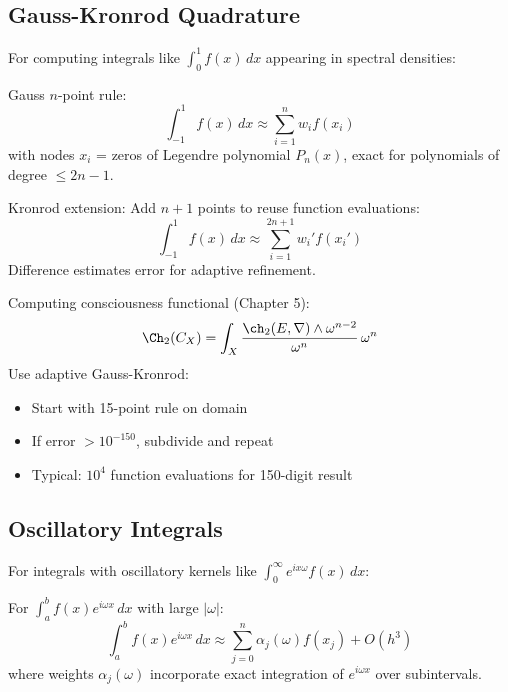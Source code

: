 \subsection{Gauss-Kronrod Quadrature}

For computing integrals like $\int_0^1 f(x)\,dx$ appearing in spectral densities:

\begin{defn}\label{def:gauss-kronrod}
Gauss $n$-point rule:
\begin{equation}
\int_{-1}^1 f(x)\,dx \approx \sum_{i=1}^n w_i f(x_i)
\end{equation}
with nodes $x_i$ = zeros of Legendre polynomial $P_n(x)$, exact for polynomials of degree $\leq 2n-1$.

Kronrod extension: Add $n+1$ points to reuse function evaluations:
\begin{equation}
\int_{-1}^1 f(x)\,dx \approx \sum_{i=1}^{2n+1} w_i' f(x_i')
\end{equation}
Difference estimates error for adaptive refinement.
\end{defn}

\begin{example}
Computing consciousness functional (Chapter 5):
\begin{equation}
\Ch_2(C_X) = \int_X \frac{\ch_2(E,\nabla) \wedge \omega^{n-2}}{\omega^n}\,\omega^n
\end{equation}
Use adaptive Gauss-Kronrod:
\begin{itemize}
\item Start with 15-point rule on domain
\item If error $> 10^{-150}$, subdivide and repeat
\item Typical: $10^4$ function evaluations for 150-digit result
\end{itemize}
\end{example}

\subsection{Oscillatory Integrals}

For integrals with oscillatory kernels like $\int_0^\infty e^{ix\omega} f(x)\,dx$:

\begin{thm}\label{thm:filon}
For $\int_a^b f(x) e^{i\omega x}\,dx$ with large $|\omega|$:
\begin{equation}
\int_a^b f(x) e^{i\omega x}\,dx \approx \sum_{j=0}^n \alpha_j(\omega) f(x_j) + O(h^3)
\end{equation}
where weights $\alpha_j(\omega)$ incorporate exact integration of $e^{i\omega x}$ over subintervals.
\end{thm}

